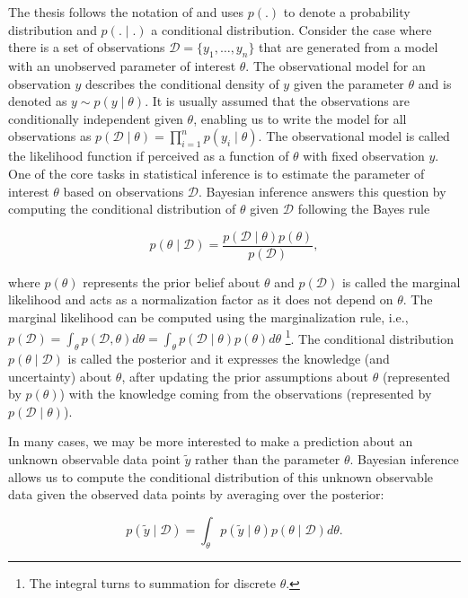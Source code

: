 \documentclass[dissertation,math,vertlayout,pdfa,colorlinks]{aaltoseries}
\newcommand{\bD}{\mathcal{D}}
\begin{document}
The thesis follows the notation of \cite{Gelman2013} and uses $p(.)$ to denote a probability distribution and $p(.\mid.)$ a conditional distribution. Consider the case where there is a set of observations $\bD= \{y_1,\ldots,y_n\}$ that are generated from a model with an unobserved parameter of interest $\theta$. The observational model for an observation $y$ describes the conditional density of $y$ given the parameter $\theta$ and is denoted as $y \sim p(y \mid \theta)$. It is usually assumed that the observations are conditionally independent given $\theta$, enabling us to write the model for all observations as $p(\bD \mid \theta) =  \prod_{i=1}^{n} p(y_i \mid \theta)$. The observational model is called the likelihood function if perceived as a function of $\theta$ with fixed observation $y$. One of the core tasks in statistical inference is to estimate the parameter of interest $\theta$ based on observations $\bD$. %
Bayesian inference answers this question by computing the conditional distribution of $\theta$ given $\bD$ following the Bayes rule


\begin{equation}\label{Eq:Bayes}
p(\theta \mid \bD) = \frac{p(\bD \mid \theta)p(\theta)}{p(\bD)},
\end{equation}  

\noindent where $p(\theta)$ represents the prior belief about $\theta$ and $p(\bD)$ is called the marginal likelihood and acts as a normalization factor as it does not depend on $\theta$. The marginal likelihood can be computed using the marginalization rule, i.e., $p(\bD)= \int_{\theta} p(\bD, \theta)d\theta= \int_{\theta} p(\bD \mid \theta)p(\theta) d\theta$ \footnote{The integral turns to summation for discrete $\theta$.}. The conditional distribution $p(\theta \mid \bD)$ is called the posterior and it expresses the knowledge (and uncertainty) about $\theta$, after updating the prior assumptions about $\theta$ (represented by $p(\theta)$) with the knowledge coming from the observations (represented by $p(\bD \mid \theta)$).  

In many cases, we may be more interested to make a prediction about an unknown observable data point $\tilde{y}$ rather than the parameter $\theta$. Bayesian inference allows us to compute the conditional distribution of this unknown observable data given the observed data points by averaging over the posterior: 

\begin{equation}
p(\tilde{y} \mid\bD ) = \int_{\theta} p(\tilde{y}  \mid \theta)p(\theta \mid \bD)d\theta. 
\end{equation}
\end{document}
